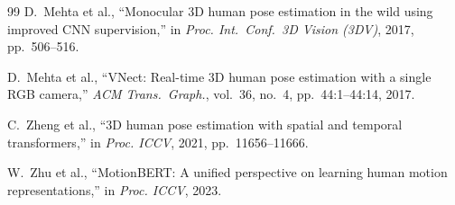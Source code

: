 \documentclass[fleqn]{ieej}
\begin{document}
\begin{thebibliography}{99}
D.~Mehta et al.,
``Monocular 3D human pose estimation in the wild using improved CNN
supervision,''
in \textit{Proc. Int.\ Conf.\ 3D Vision (3DV)}, 2017, pp.~506--516.

D.~Mehta et al.,
``VNect: Real-time 3D human pose estimation with a single RGB camera,''
\textit{ACM Trans.\ Graph.}, vol.~36, no.~4, pp.~44:1--44:14, 2017.

C.~Zheng et al.,
``3D human pose estimation with spatial and temporal transformers,''
in \textit{Proc. ICCV}, 2021, pp.~11656--11666.

W.~Zhu et al.,
``MotionBERT: A unified perspective on learning human motion
representations,''
in \textit{Proc. ICCV}, 2023.

\end{thebibliography}


\begin{biography}
\end{biography}
\end{document}
